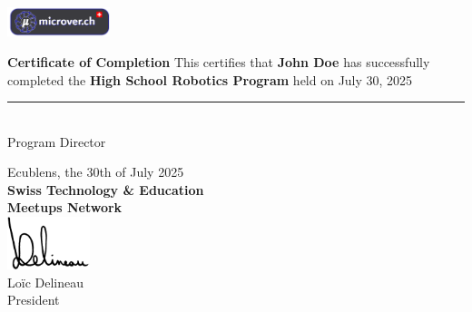 \documentclass[10pt]{article}
\begin{document}
\begin{center}
	\includegraphics[width=3cm]{logo.png}
\end{center}

\vspace*{2cm}

\begin{center}
	{\LARGE \bfseries Certificate of Completion}
	\vspace{1.5cm}
	{\large This certifies that}
	\vspace{1cm}
	{\Huge \bfseries John Doe}
	\vspace{1cm}
	{\large has successfully completed the}
	\vspace{1cm}
	{\LARGE \bfseries High School Robotics Program}
	\vspace{1cm}
	{\large held on July 30, 2025}
	\vspace{3cm}
	\rule{6cm}{0.4pt} \\
	Program Director
\end{center}

\begin{flushright}
\end{flushright}

\vfill

\begin{flushright}
	\begin{minipage}{10cm}
		\raggedright
		Ecublens, the 30th of July 2025 \\
		\textbf{Swiss Technology \& Education} \\
		\textbf{Meetups Network} \\
		\vspace{0.3cm}
		\includegraphics[width=2.4cm]{signature-tight.png} \\
		Loïc Delineau \\
		President \\
	\end{minipage}
\end{flushright}
\end{document}
